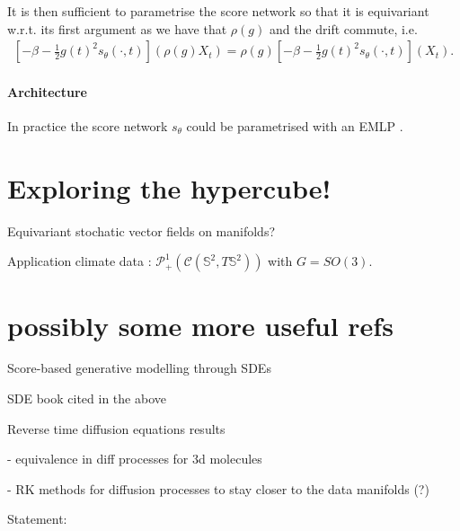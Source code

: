 It is then sufficient to parametrise the score network so that it is equivariant w.r.t. its first argument as we have that $\rho(g)$ and the drift commute, i.e.\
\begin{align}
    \left[- \beta - \frac{1}{2} g(t)^2 s_\theta\left(\cdot, t\right) \right] \left(\rho(g) X_t \right) = 
    \rho(g) \left[- \beta - \frac{1}{2} g(t)^2 s_\theta\left(\cdot, t\right)\right] (X_t).
\end{align}

\paragraph{Architecture}
In practice the score network $s_\theta$ could be parametrised with an EMLP \cite{finzi2021Practicala}.

\section{Exploring the hypercube!}
Equivariant stochatic vector fields on manifolds?

Application climate data \cite{holderrieth2021equivariant}: $\mathcal{P}_+^1\left(\mathcal{C}\left(\mathbb{S}^2, T\mathbb{S}^2\right)\right)$ with $G=SO(3)$.

\section{possibly some more useful refs}
\cite{song2020score} Score-based generative modelling through SDEs


\cite{oksendal2003stochastic} SDE book cited in the above

\cite{anderson1982reverse} Reverse time diffusion equations results

\cite{anonymous2022geodiff} - equivalence in diff processes for 3d molecules

\cite{anonymous2022pseudo} - RK methods for diffusion processes to stay closer to the data manifolds (?)

Statement:

